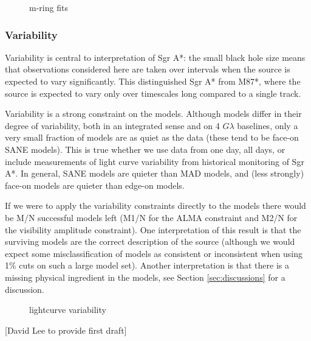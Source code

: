 \begin{figure}
  \caption{m-ring fits}
  \label{fig:cmp_m-ring}
\end{figure}

\subsubsection{Variability}

Variability is central to interpretation of Sgr A*: the small black hole size means that observations considered here are taken over intervals when the source is expected to vary significantly.  This distinguished Sgr A* from M87*, where the source is expected to vary only over timescales long compared to a single track.

Variability is a strong constraint on the models.  Although models differ in their degree of variability, both in an integrated sense and on 4 $G\lambda$ baselines, only a very small fraction of models are as quiet as the data (these tend to be face-on SANE models).  This is true whether we use data from one day, all days, or include measurements of light curve variability from historical monitoring of Sgr A*.   In general, SANE models are quieter than MAD models, and (less strongly) face-on models are quieter than edge-on models.

If we were to apply the variability constraints directly to the models there would be M/N successful models left (M1/N for the ALMA constraint and M2/N for the visibility amplitude constraint).  One interpretation of this result is that the surviving models are the correct description of the source (although we would expect some misclassification of models as consistent or inconsistent when using 1\% cuts on such a large model set).  Another interpretation is that there is a missing physical ingredient in the models, see Section \ref{sec:discussions} for a discussion.


\begin{figure}
  \caption{lightcurve variability}
  \label{fig:cmp_ALMA_var}
\end{figure}

[David Lee to provide first draft]


